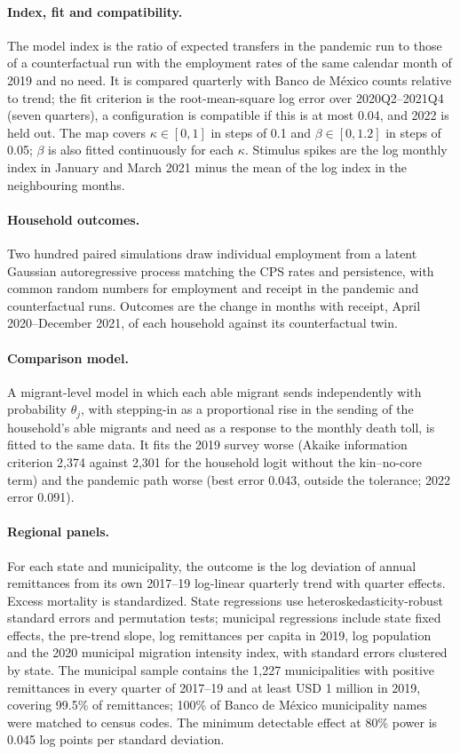 \documentclass[11pt]{article}
\begin{document}
\paragraph{Index, fit and compatibility.} The model index is the ratio of expected transfers in the pandemic run to those of a counterfactual run with the employment rates of the same calendar month of 2019 and no need. It is compared quarterly with Banco de M\'exico counts relative to trend; the fit criterion is the root-mean-square log error over 2020Q2--2021Q4 (seven quarters), a configuration is compatible if this is at most 0.04, and 2022 is held out. The map covers $\kappa \in [0,1]$ in steps of 0.1 and $\beta \in [0, 1.2]$ in steps of 0.05; $\beta$ is also fitted continuously for each $\kappa$. Stimulus spikes are the log monthly index in January and March 2021 minus the mean of the log index in the neighbouring months.

\paragraph{Household outcomes.} Two hundred paired simulations draw individual employment from a latent Gaussian autoregressive process matching the CPS rates and persistence, with common random numbers for employment and receipt in the pandemic and counterfactual runs. Outcomes are the change in months with receipt, April 2020--December 2021, of each household against its counterfactual twin.

\paragraph{Comparison model.} A migrant-level model in which each able migrant sends independently with probability $\theta_j$, with stepping-in as a proportional rise in the sending of the household's able migrants and need as a response to the monthly death toll, is fitted to the same data. It fits the 2019 survey worse (Akaike information criterion 2,374 against 2,301 for the household logit without the kin--no-core term) and the pandemic path worse (best error 0.043, outside the tolerance; 2022 error 0.091).

\paragraph{Regional panels.} For each state and municipality, the outcome is the log deviation of annual remittances from its own 2017--19 log-linear quarterly trend with quarter effects. Excess mortality is standardized. State regressions use heteroskedasticity-robust standard errors and permutation tests; municipal regressions include state fixed effects, the pre-trend slope, log remittances per capita in 2019, log population and the 2020 municipal migration intensity index, with standard errors clustered by state. The municipal sample contains the 1,227 municipalities with positive remittances in every quarter of 2017--19 and at least USD 1 million in 2019, covering 99.5\% of remittances; 100\% of Banco de M\'exico municipality names were matched to census codes. The minimum detectable effect at 80\% power is 0.045 log points per standard deviation.
\end{document}
